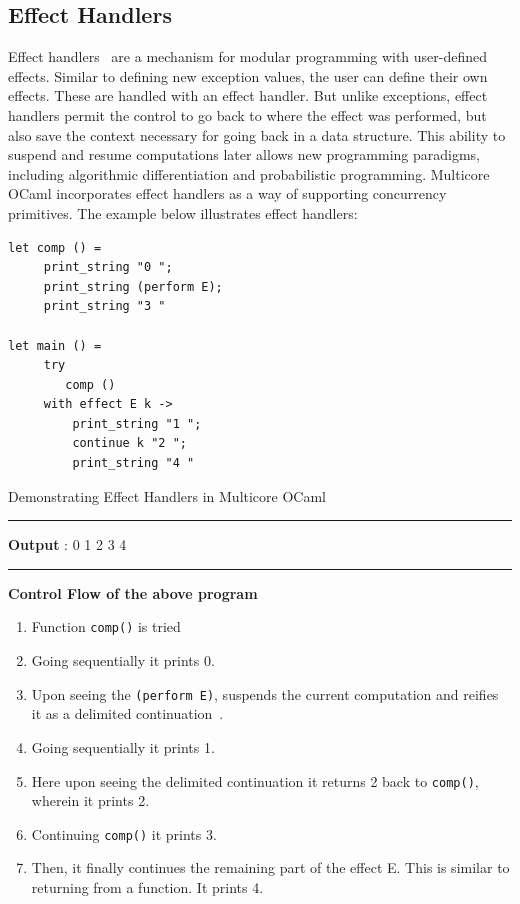 \documentclass[a4paper,11pt]{article}
\theoremstyle{mytheor}
\begin{document}
\subsection{Effect Handlers}

Effect handlers~\cite{effects} are a mechanism for modular programming with user-defined effects. Similar to defining new exception values, the user can define their own effects. These are handled with an effect handler. But unlike exceptions, effect handlers permit the control to go back to where the effect was performed, but also save the context necessary for going back in a data structure. This ability to suspend and resume computations later allows new programming paradigms, including algorithmic differentiation and probabilistic programming. Multicore OCaml incorporates effect handlers as a way of supporting concurrency primitives. The example below illustrates effect handlers:

\begin{listing}[H]
\centering
\begin{verbatim}
let comp () =
     print_string "0 ";
     print_string (perform E);
     print_string "3 "

let main () =
     try
        comp ()
     with effect E k ->
         print_string "1 ";
         continue k "2 ";
         print_string "4 "
\end{verbatim}

\caption{Demonstrating Effect Handlers in Multicore OCaml}
\end{listing}
\vspace{0.5cm}
\hrule
\vspace{0.5cm}
\textbf{Output} : 0 1 2 3 4 
\vspace{0.5cm}
\hrule
\vspace{0.5cm}
% 
\noindent
\textbf{Control Flow of the above program}
\begin{enumerate}
    \item Function \lstinline{comp()} is tried
    \item Going sequentially it prints 0.
    \item Upon seeing the \lstinline{(perform E)}, suspends the current computation and reifies it as a delimited continuation~\cite{delim}.
    \item Going sequentially it prints 1.
    \item Here upon seeing the delimited continuation it returns 2 back to \lstinline{comp()}, wherein it prints 2.
    \item Continuing \lstinline{comp()} it prints 3.
    \item Then, it finally continues the remaining part of the effect E. This is similar to returning from a function. It prints 4.
\end{enumerate}
\end{document}
